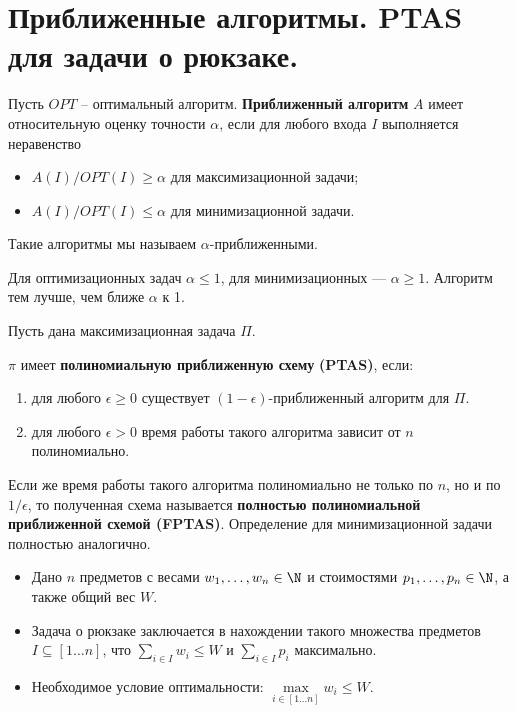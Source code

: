 \documentclass[a4paper,12pt]{article}
\begin{document}
\section{Приближенные алгоритмы. PTAS для задачи о рюкзаке.}
\begin{definition}
Пусть $OPT$ -- оптимальный алгоритм. \textbf{Приближенный алгоритм} $A$ имеет относительную оценку точности
$\alpha$, если для любого входа $I$
выполняется неравенство
\begin{itemize}
    \item $A(I)\slash OPT(I) \geqslant \alpha$ для максимизационной задачи;
    \item $A(I)/OPT(I)\leqslant \alpha$ для минимизационной задачи.
\end{itemize}
Такие алгоритмы мы называем $\alpha$-приближенными.

Для оптимизационных задач $\alpha \leqslant 1$, для минимизационных — $\alpha \geqslant 1$.
Алгоритм тем лучше, чем ближе $\alpha$ к 1.
\end{definition}
\begin{definition}
Пусть дана максимизационная задача $\Pi$.

$\pi$ имеет \textbf{полиномиальную приближенную схему} \textbf{(PTAS)}, если:
\begin{enumerate}
    \item для любого $\epsilon \geqslant 0$ существует $(1 - \epsilon)$-приближенный алгоритм для $\Pi$.
    \item для любого $\epsilon > 0$ время работы такого алгоритма зависит от $n$ полиномиально.
\end{enumerate}
Если же время работы такого алгоритма полиномиально не
только по $n$, но и по $1\slash\epsilon$, то полученная схема называется
\textbf{полностью полиномиальной приближенной схемой (FPTAS)}.
Определение для минимизационной задачи полностью
аналогично.
\end{definition}
\begin{on1n}
\begin{itemize}
    \item Дано $n$ предметов с весами $w_1, \ldots , w_n \in \N$ и стоимостями     $p_1, \ldots, p_n \in \N$, а также общий вес $W$.
    \item Задача о рюкзаке заключается в нахождении такого множества предметов $I \subseteq [1\ldots n]$, что $\sum\limits_{i \in I}w_i \leqslant W$ и $\sum\limits_{i \in I}p_i$ максимально.
    \item Необходимое условие оптимальности: $\max\limits_{i \in [1\ldots n]}w_i \leqslant W$.
\end{itemize}
\end{on1n}
\end{document}
